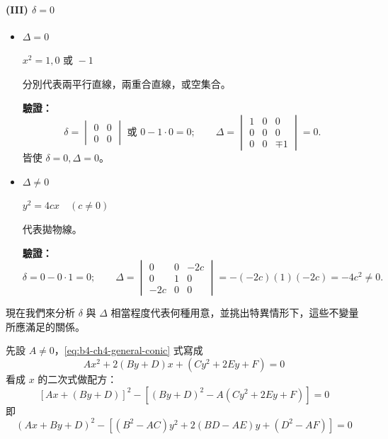 \paragraph*{(III) $\delta = 0$}
\begin{itemize}
  \item[(i)] $\Delta = 0$
  \begin{example}
  $x^2 = 1, 0 \text{ 或 } -1$
  
  分別代表兩平行直線，兩重合直線，或空集合。
  
  \textbf{驗證：}
  \[
  \delta = \begin{vmatrix} 0 & 0 \\ 0 & 0 \end{vmatrix} \text{ 或 } 0 - 1 \cdot 0 = 0; \qquad
  \Delta = \begin{vmatrix} 1 & 0 & 0 \\ 0 & 0 & 0 \\ 0 & 0 & \mp 1 \end{vmatrix} = 0.
  \]
  皆使 $\delta = 0, \Delta = 0$。
  \end{example}

  \item[(ii)] $\Delta \ne 0$
  \begin{example}
  $y^2 = 4cx \quad (c \ne 0)$
  
  代表拋物線。
  
  \textbf{驗證：}
  \[
  \delta = 0 - 0 \cdot 1 = 0; \qquad
  \Delta = \begin{vmatrix} 0 & 0 & -2c \\ 0 & 1 & 0 \\ -2c & 0 & 0 \end{vmatrix} = -(-2c)(1)(-2c) = -4c^2 \ne 0.
  \]
  \end{example}
\end{itemize}

現在我們來分析 $\delta$ 與 $\Delta$ 相當程度代表何種用意，並挑出特異情形下，這些不變量所應滿足的關係。

先設 $A \ne 0$，\eqref{eq:b4-ch4-general-conic} 式寫成
\[
Ax^2 + 2(By + D)x + (Cy^2 + 2Ey + F) = 0
\]
看成 $x$ 的二次式做配方：
\[
[Ax + (By + D)]^2 - [(By + D)^2 - A(Cy^2 + 2Ey + F)] = 0
\]
即
\begin{equation}
(Ax + By + D)^2 - [(B^2 - AC)y^2 + 2(BD - AE)y + (D^2 - AF)] = 0
\label{eq:b4-ch4-complete-square-x}
\end{equation}


